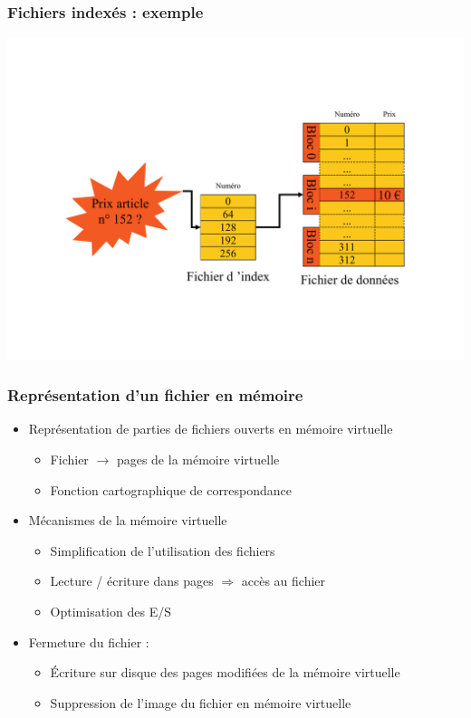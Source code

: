 \begin{frame}
\frametitle{Fichiers indexés : exemple}
\includegraphics[width=\textwidth]{../illustration/fichier_indexe_exemple.pdf}
\end{frame}



\begin{frame}
\frametitle{Représentation d'un fichier en mémoire}
\begin{itemize}
\item Représentation de parties de fichiers ouverts en mémoire virtuelle
\begin{itemize}
  \item Fichier $\rightarrow$ pages de la mémoire virtuelle
  \item Fonction cartographique de correspondance
\end{itemize}
\item Mécanismes de la mémoire virtuelle
\begin{itemize}
  \item Simplification de l'utilisation des fichiers
  \item Lecture / écriture dans pages $\Longrightarrow$ accès au fichier
  \item Optimisation des E/S
\end{itemize}
\item Fermeture du fichier :
\begin{itemize}
  \item Écriture sur disque des pages modifiées de la mémoire virtuelle
  \item Suppression de l'image du fichier en mémoire virtuelle
\end{itemize}
\end{itemize}
\end{frame}


